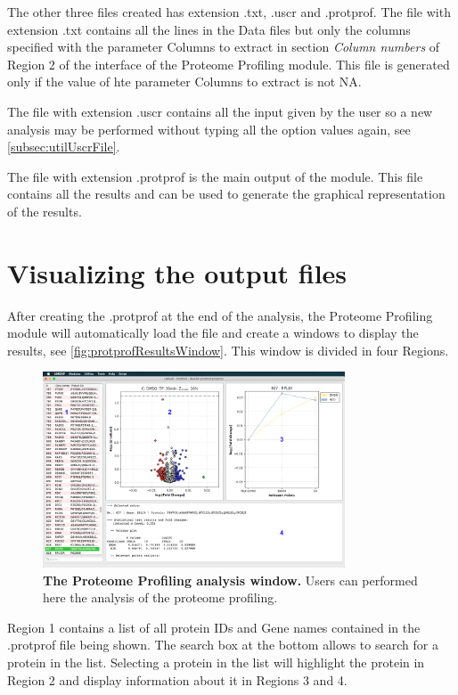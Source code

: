The other three files created has extension .txt, .uscr and .protprof. The file with extension .txt contains all the lines in the Data files but only the columns specified with the parameter Columns to extract in section \textit{Column numbers} of Region \num{2} of the interface of the Proteome Profiling module. This file is generated only if the value of hte parameter Columns to extract is not NA. 

The file with extension .uscr contains all the input given by the user so a new analysis may be performed without typing all the option values again, see \autoref{subsec:utilUscrFile}. 

The file with extension .protprof is the main output of the module. This file contains all the results and can be used to generate the graphical representation of the results.    

\section{Visualizing the output files}

After creating the .protprof at the end of the analysis, the Proteome Profiling module will automatically load the file and create a windows to display the results, see \autoref{fig:protprofResultsWindow}. This window is divided in four Regions. 

\begin{figure}[h]
	\centering
	\includegraphics[width=0.8\textwidth]{./IMAGES/MOD-PROTPROF/protprof-frag.jpg}	    
	\caption[The Proteome Profiling analysis window]{\textbf{The Proteome Profiling analysis window.} Users can performed here the analysis of the proteome profiling.} 
	\label{fig:protprofResultsWindow}
	\vspace{-5pt} 	
\end{figure}

Region \num{1} contains a list of all protein IDs and Gene names contained in the .protprof file being shown. The search box at the bottom allows to search for a protein in the list. Selecting a protein in the list will highlight the protein in Region \num{2} and display information about it in Regions \num{3} and \num{4}.

